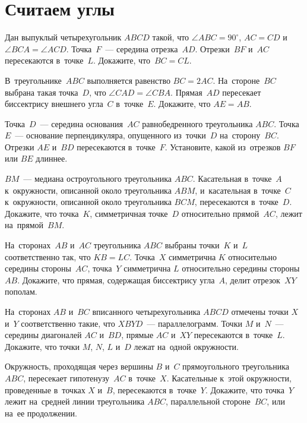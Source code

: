 
\section*{Считаем углы}


\begin{problems}

\item
Дан выпуклый четырехугольник $ABCD$ такой, что $\angle ABC = 90^{\circ}$,
$AC = CD$ и~$\angle BCA = \angle ACD$.
Точка~$F$~--- середина отрезка~$AD$.
Отрезки~$BF$ и~$AC$ пересекаются в~точке~$L$.
Докажите, что~$BC = CL$.

\item
В~треугольнике~$ABC$ выполняется равенство $BC = 2 AC$.
На~стороне~$BC$ выбрана такая точка~$D$, что $\angle CAD = \angle CBA$.
Прямая~$AD$ пересекает биссектрису внешнего угла~$C$ в~точке~$E$.
Докажите, что $AE = AB$.

\item
Точка~$D$~--- середина основания~$AC$ равнобедренного треугольника $ABC$.
Точка~$E$~--- основание перпендикуляра, опущенного из~точки~$D$
на~сторону~$BC$.
Отрезки $AE$ и~$BD$ пересекаются в~точке~$F$.
Установите, какой из~отрезков $BF$ или $BE$ длиннее.

\item
$BM$~--- медиана остроугольного треугольника $ABC$.
Касательная в~точке~$A$ к~окружности, описанной около треугольника $ABM$,
и~касательная в~точке~$C$ к~окружности, описанной около треугольника $BCM$,
пересекаются в~точке~$D$.
Докажите, что точка~$K$, симметричная точке~$D$ относительно прямой~$AC$, лежит
на~прямой~$BM$.

\item
На~сторонах~$AB$ и~$AC$ треугольника $ABC$ выбраны точки~$K$ и~$L$
соответственно так, что $KB = LC$.
Точка~$X$ симметрична $K$ относительно середины стороны~$AC$,
точка~$Y$ симметрична $L$ относительно середины стороны~$AB$.
Докажите, что прямая, содержащая биссектрису угла~$A$, делит отрезок~$XY$
пополам.

\item
На~сторонах $AB$ и~$BC$ вписанного четырехугольника $ABCD$ отмечены точки $X$
и~$Y$ соответственно такие, что $XBYD$~--- параллелограмм.
Точки $M$ и~$N$~--- середины диагоналей $AC$ и~$BD$, прямые $AC$ и~$XY$
пересекаются в~точке~$L$.
Докажите, что точки $M$, $N$, $L$ и~$D$ лежат на~одной окружности.

\item
Окружность, проходящая через вершины $B$ и~$C$ прямоугольного
треугольника $ABC$, пересекает гипотенузу~$AC$ в~точке~$X$.
Касательные к~этой окружности, проведенные в~точках $X$ и~$B$, пересекаются
в~точке~$Y$.
Докажите, что точка~$Y$ лежит на~средней линии треугольника $ABC$, параллельной
стороне~$BC$, или на~ее продолжении.

\end{problems}

